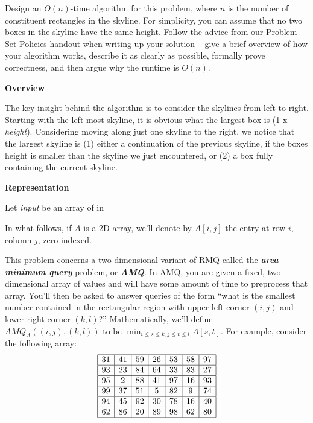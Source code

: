 \documentclass[12pt]{exam}
\newcommand{\Q}[1]{\question{\large{\textbf{#1}}}}
\begin{document}
\begin{questions}
Design an $O(n)$-time algorithm for this problem, where $n$ is the number of constituent rectangles in the skyline. For simplicity, you can assume that no two boxes in the skyline have the same height. Follow the advice from our Problem Set Policies handout when writing up your solution -- give a brief overview of how your algorithm works, describe it as clearly as possible, formally prove correctness, and then argue why the runtime is $O(n)$.

\begin{solution}
\textbf{Overview}

The key insight behind the algorithm is to consider the skylines from left to right. Starting with the left-most skyline, it is obvious what the largest box is (1 x \textit{height}). Considering moving along just one skyline to the right, we notice that the largest skyline is (1) either a continuation of the previous skyline, if the boxes height is smaller than the skyline we just encountered, or (2) a box fully containing the current skyline.

\textbf{Representation}

Let \textit{input} be an array of in
\end{solution}

\newpage
\Q{Problem Two: Area Minimum Queries (4 Points)}

In what follows, if $A$ is a 2D array, we'll denote by $A[i, j]$ the entry at row $i$, column $j$, zero-indexed.

This problem concerns a two-dimensional variant of RMQ called the \textbf{\emph{area minimum query}} problem, or \textbf{\emph{AMQ}}. In AMQ, you are given a fixed, two-dimensional array of values and will have some amount of time to preprocess that array. You'll then be asked to answer queries of the form ``what is the smallest number contained in the rectangular region with upper-left corner $(i, j)$ and lower-right corner $(k, l)$?'' Mathematically, we'll define $AMQ_A((i, j), (k, l))$ to be $\min_{i \le s \le k, j \le t \le l} A[s, t]$. For example, consider the following array:
\[
\begin{array}{|c|c|c|c|c|c|c|}
\hline
31 & 41 & 59 & 26 & 53 & 58 & 97 \\ \hline
93 & 23 & 84 & 64 & 33 & 83 & 27 \\ \hline
95 &  2 & 88 & 41 & 97 & 16 & 93 \\ \hline
99 & 37 & 51 &  5 & 82 &  9 & 74 \\ \hline
94 & 45 & 92 & 30 & 78 & 16 & 40 \\ \hline
62 & 86 & 20 & 89 & 98 & 62 & 80 \\ \hline
\end{array}
\]


\end{questions}
\end{document}
